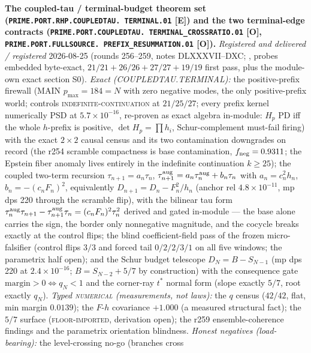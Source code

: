 \documentclass[11pt,a4paper]{article}
\begin{document}
\par\smallskip\noindent\textbf{The coupled-tau / terminal-budget
theorem set (\texttt{PRIME.PORT.RHP.COUPLEDTAU.\allowbreak
TERMINAL.01} [E]) and the two terminal-edge contracts
(\texttt{PRIME.PORT.COUPLEDTAU.\allowbreak
TERMINAL\_CROSSRATIO.01} [O],
\texttt{PRIME.PORT.FULLSOURCE.\allowbreak
PREFIX\_RESUMMATION.01} [O]).}
{\sloppy
\emph{Registered and delivered / registered} 2026-08-25 (rounds
256--259, notes DLXXXVII--DXC;
, probes embedded
byte-exact, $21/21 + 26/26 + 27/27 + 19/19$ first pass, plus the
module-own exact section S0).  \emph{Exact (COUPLEDTAU.TERMINAL):}
the positive-prefix firewall (MAIN $p_{\max} = 184 = N$ with zero
negative modes, the only positive-prefix world; controls
\textsc{indefinite-continuation} at $21/25/27$; every prefix
kernel numerically PSD at $5.7\times10^{-16}$, re-proven as exact
algebra in-module: $H_p$ PD iff the whole $h$-prefix is positive,
$\det H_p = \prod h_i$, Schur-complement must-fail firing) with
the exact $2\times2$ causal census and its two contamination
downgrades on record (the r254 scramble compactness is base
contamination, $f_{\rm neg} = 0.9311$; the Epstein fiber anomaly
lives entirely in the indefinite continuation $k \ge 25$); the
coupled two-term recursion $\tau_{n+1} = a_n\tau_n$,
$\tau^{\rm aug}_{n+1} = a_n\tau^{\rm aug}_n + b_n\tau_n$ with
$a_n = c_n^2h_n$, $b_n = -(c_nF_n)^2$, equivalently $D_{n+1} =
D_n - F_n^2/h_n$ (anchor rel $4.8\times10^{-11}$, mp dps 220
through the scramble flip), with the bilinear tau form
$\tau^{\rm aug}_n\tau_{n+1} - \tau^{\rm aug}_{n+1}\tau_n =
(c_nF_n)^2\tau_n^2$ derived and gated in-module --- the base
alone carries the sign, the border only nonnegative magnitude,
and the cocycle breaks exactly at the control flips; the blind
coefficient-field pass of the frozen micro-falsifier (control
flips $3/3$ and forced tail $0/2/2/3/1$ on all five windows; the
parametrix half open); and the Schur budget telescope $D_N = B -
S_{N-1}$ (mp dps 220 at $2.4\times10^{-16}$; $B = S_{N-2} + 5/7$
by construction) with the consequence gate $\text{margin} > 0
\iff q_N < 1$ and the corner-ray $t^*$ normal form (slope exactly
$5/7$, root exactly $q_N$).  \emph{Typed \textsc{numerical}
(measurements, not laws):} the $q$ census ($42/42$, flat, min
margin $0.0139$); the $F$-$h$ covariance $+1.000$ (a measured
structural fact); the $5/7$ surface (\textsc{floor-imported},
derivation open); the r259 ensemble-coherence findings and the
parametrix orientation blindness.  \emph{Honest negatives
(load-bearing):} the level-crossing no-go (branches cross
}
\end{document}
